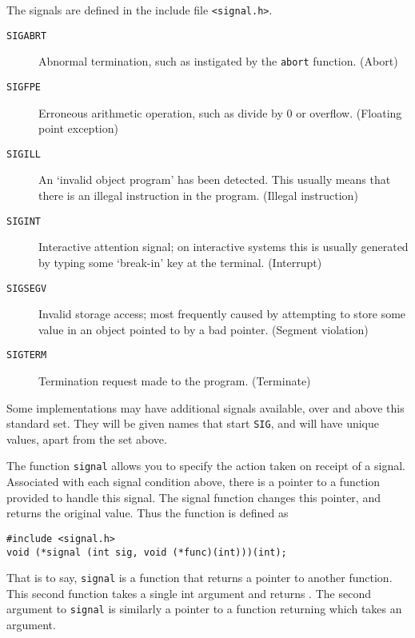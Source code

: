   The signals are defined in the include file
   \texttt{<signal.h>}.


  \begin{description}
   \item[\texttt{SIGABRT}] Abnormal termination, such as instigated by the \texttt{abort} function. (Abort)

   \item[\texttt{SIGFPE}] Erroneous arithmetic operation, such as divide by 0 or
    overflow. (Floating point exception)

   \item[\texttt{SIGILL}] An `invalid object program' has been detected. This
    usually means that there is an illegal instruction in the
    program.  (Illegal instruction)

   \item[\texttt{SIGINT}] Interactive attention signal; on interactive systems this
    is usually generated by typing some `break-in' key at the
    terminal. (Interrupt)

   \item[\texttt{SIGSEGV}] Invalid storage access; most frequently caused by
    attempting to store some value in an object pointed to by
    a bad pointer.  (Segment violation)

   \item[\texttt{SIGTERM}] Termination request made to the program. (Terminate)
  \end{description}

  Some implementations may have additional signals available, over and above
   this standard set. They will be given names that start \texttt{SIG}, and
   will have unique values, apart from the set above.


  The function \texttt{signal} allows you to specify the action taken on
   receipt of a signal.  Associated with each signal condition above, there is
   a pointer to a function provided to handle this signal. The signal function
   changes this pointer, and returns the original value.  Thus the function is
   defined as


  \begin{Verbatim}
#include <signal.h>
void (*signal (int sig, void (*func)(int)))(int);
\end{Verbatim}

  That is to say, \texttt{signal} is a function that returns a  pointer
   to another function. This second function takes a single int argument and
   returns \void.  The second argument to \texttt{signal} is
   similarly a pointer to a function returning \void{} which takes an
   \kint{} argument.


